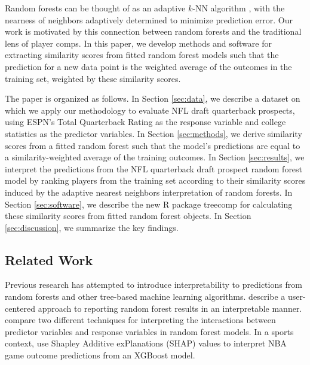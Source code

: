 \documentclass[Review, sageh, times]{sagej}
\begin{document}
Random forests can be thought of as an adaptive $k$-NN algorithm \citep{lin_random_2006}, with the nearness of neighbors adaptively determined to minimize prediction error. Our work is motivated by this connection between random forests and the traditional lens of player comps. In this paper, we develop methods and software for extracting similarity scores from fitted random forest models such that the prediction for a new data point is the weighted average of the outcomes in the training set, weighted by these similarity scores.

The paper is organized as follows. In Section \ref{sec:data}, we describe a dataset on which we apply our methodology to evaluate NFL draft quarterback prospects, using ESPN's Total Quarterback Rating as the response variable and college statistics as the predictor variables. In Section \ref{sec:methods}, we derive similarity scores from a fitted random forest such that the model's predictions are equal to a similarity-weighted average of the training outcomes. In Section \ref{sec:results}, we interpret the predictions from the NFL quarterback draft prospect random forest model by ranking players from the training set according to their similarity scores induced by the adaptive nearest neighbors interpretation of random forests. In Section \ref{sec:software}, we describe the new R package treecomp for calculating these similarity scores from fitted random forest objects. In Section \ref{sec:discussion}, we summarize the key findings.

\subsection{Related Work}

Previous research has attempted to introduce interpretability to predictions from random forests and other tree-based machine learning algorithms. \citet{petkovic_improving_2018} describe a user-centered approach to reporting random forest results in an interpretable manner. \citet{aria_comparison_2021} compare two different techniques for interpreting the interactions between predictor variables and response variables in random forest models. In a sports context, \citet{ouyang_integration_2024} use Shapley Additive exPlanations (SHAP) values to interpret NBA game outcome predictions from an XGBoost model.
\end{document}
